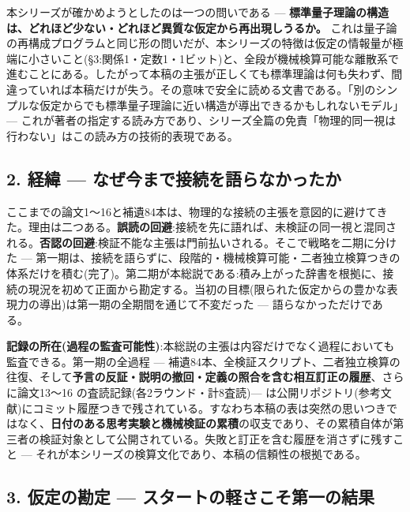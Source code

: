\documentclass[
]{ltjsarticle}
\begin{document}
本シリーズが確かめようとしたのは一つの問いである ---
\textbf{標準量子理論の構造は、どれほど少ない・どれほど異質な仮定から再出現しうるか。}
これは量子論の再構成プログラムと同じ形の問いだが、本シリーズの特徴は仮定の情報量が極端に小さいこと(§3:関係1・定数1・1ビット)と、全段が機械検算可能な離散系で進むことにある。したがって本稿の主張が正しくても標準理論は何も失わず、間違っていれば本稿だけが失う。その意味で安全に読める文書である。「別のシンプルな仮定からでも標準量子理論に近い構造が導出できるかもしれないモデル」---
これが著者の指定する読み方であり、シリーズ全篇の免責「物理的同一視は行わない」はこの読み方の技術的表現である。

\subsection{2. 経緯 ---
なぜ今まで接続を語らなかったか}\label{ux7d4cux7def-ux306aux305cux4ecaux307eux3067ux63a5ux7d9aux3092ux8a9eux3089ux306aux304bux3063ux305fux304b}

ここまでの論文1〜16と補遺84本は、物理的な接続の主張を意図的に避けてきた。理由は二つある。\textbf{誤読の回避}:接続を先に語れば、未検証の同一視と混同される。\textbf{否認の回避}:検証不能な主張は門前払いされる。そこで戦略を二期に分けた
---
第一期は、接続を語らずに、段階的・機械検算可能・二者独立検算つきの体系だけを積む(完了)。第二期が本総説である:積み上がった辞書を根拠に、接続の現況を初めて正面から勘定する。当初の目標(限られた仮定からの豊かな表現力の導出)は第一期の全期間を通じて不変だった
--- 語らなかっただけである。

\textbf{記録の所在(過程の監査可能性)}:本総説の主張は内容だけでなく過程においても監査できる。第一期の全過程
---
補遺84本、全検証スクリプト、二者独立検算の往復、そして\textbf{予言の反証・説明の撤回・定義の照合を含む相互訂正の履歴}、さらに論文13〜16
の査読記録(各2ラウンド・計8査読)---
は公開リポジトリ(参考文献)にコミット履歴つきで残されている。すなわち本稿の表は突然の思いつきではなく、\textbf{日付のある思考実験と機械検証の累積}の収支であり、その累積自体が第三者の検証対象として公開されている。失敗と訂正を含む履歴を消さずに残すこと
--- それが本シリーズの検算文化であり、本稿の信頼性の根拠である。

\subsection{3. 仮定の勘定 ---
スタートの軽さこそ第一の結果}\label{ux4eeeux5b9aux306eux52d8ux5b9a-ux30b9ux30bfux30fcux30c8ux306eux8efdux3055ux3053ux305dux7b2cux4e00ux306eux7d50ux679c}
\end{document}
